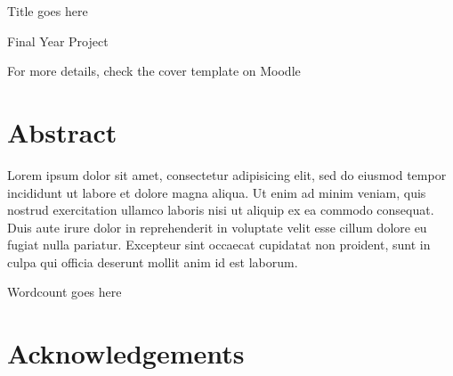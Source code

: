 \documentclass[11pt, twoside]{report}
\begin{document}

\vspace*{\fill}
\begingroup
\centering


Title goes here

Final Year Project

For more details, check the cover template on Moodle

\endgroup
\vspace*{\fill}

\chapter*{Abstract}
Lorem ipsum dolor sit amet, consectetur adipisicing elit, sed do eiusmod
tempor incididunt ut labore et dolore magna aliqua. Ut enim ad minim veniam,
quis nostrud exercitation ullamco laboris nisi ut aliquip ex ea commodo
consequat. Duis aute irure dolor in reprehenderit in voluptate velit esse
cillum dolore eu fugiat nulla pariatur. Excepteur sint occaecat cupidatat non proident, sunt in culpa qui officia deserunt mollit anim id est laborum.

Wordcount goes here


\chapter*{Acknowledgements}


\tableofcontents

\listoffigures

\cleardoublepage
{}












\nocite{*} %






\end{document}
